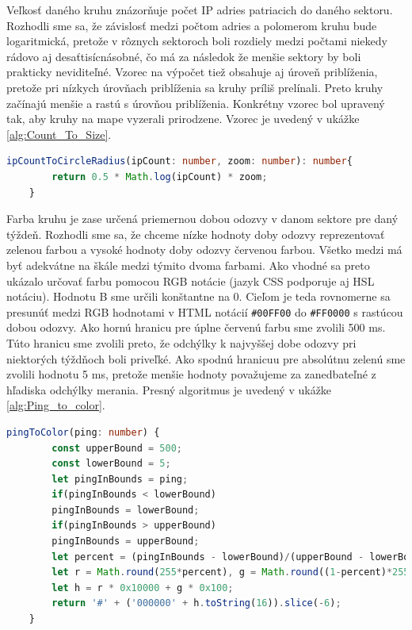 Veľkosť daného kruhu znázorňuje počet IP adries patriacich do daného sektoru. Rozhodli sme sa, že závislosť medzi počtom adries a polomerom kruhu bude 
logaritmická, pretože v rôznych sektoroch boli rozdiely medzi počtami niekedy rádovo aj desaťtisícnásobné, čo má za následok že menšie sektory by boli prakticky 
neviditeľné. Vzorec na výpočet tiež obsahuje aj úroveň priblíženia, pretože pri nízkych úrovňach priblíženia sa kruhy príliš prelínali. Preto kruhy začínajú 
menšie a rastú s úrovňou priblíženia. Konkrétny vzorec bol upravený tak, aby kruhy na mape vyzerali prirodzene. Vzorec je uvedený v 
ukážke \ref{alg:Count_To_Size}.

\begin{lstlisting}[float,language={TypeScript},caption={Ukážka kódu na výpočet veľkosti kruhu z počtu IP adries v sektore},label=alg:Count_To_Size]
    ipCountToCircleRadius(ipCount: number, zoom: number): number{
        return 0.5 * Math.log(ipCount) * zoom;
    }
\end{lstlisting}

Farba kruhu je zase určená priemernou dobou odozvy v danom sektore pre daný týždeň. Rozhodli sme sa, že chceme nízke hodnoty doby odozvy reprezentovať 
zelenou farbou a vysoké hodnoty doby odozvy červenou farbou. Všetko medzi má byť adekvátne na škále medzi týmito dvoma farbami. Ako vhodné sa preto ukázalo 
určovať farbu pomocou RGB notácie (jazyk CSS podporuje aj HSL notáciu). Hodnotu B sme určili konštantne na 0. Cieľom je teda rovnomerne sa presunúť medzi 
RGB hodnotami v HTML notácií \lstinline{#00FF00} do \lstinline{#FF0000} s rastúcou dobou odozvy. Ako hornú hranicu pre úplne červenú farbu sme zvolili 500 ms. 
Túto hranicu sme zvolili preto, že odchýlky k najvyššej dobe odozvy pri niektorých týždňoch boli priveľké. Ako spodnú hranicuu pre absolútnu zelenú sme zvolili 
hodnotu 5 ms, pretože menšie hodnoty považujeme za zanedbateľné z hľadiska odchýlky merania. Presný algoritmus je uvedený v ukážke \ref{alg:Ping_to_color}.

\begin{lstlisting}[float,language={TypeScript},caption={Ukážka kódu na výpočet veľkosti kruhu z počtu IP adries v sektore},label=alg:Ping_to_color]
    pingToColor(ping: number) {
        const upperBound = 500;
        const lowerBound = 5;
        let pingInBounds = ping;
        if(pingInBounds < lowerBound)
        pingInBounds = lowerBound;
        if(pingInBounds > upperBound)
        pingInBounds = upperBound;
        let percent = (pingInBounds - lowerBound)/(upperBound - lowerBound);
        let r = Math.round(255*percent), g = Math.round((1-percent)*255), b = 0;
        let h = r * 0x10000 + g * 0x100;
        return '#' + ('000000' + h.toString(16)).slice(-6);
    }
\end{lstlisting}

